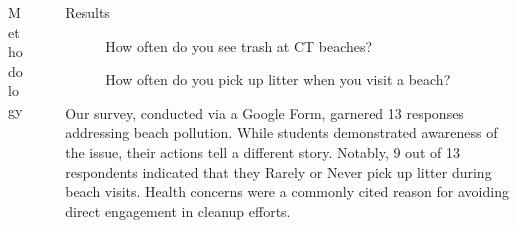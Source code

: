 \documentclass[final]{beamer}
\newlength{\sepwidth}
\newlength{\colwidth}
\newcommand{\separatorcolumn}{\begin{column}{\sepwidth}\end{column}}
\begin{document}
\begin{frame}[t]
\begin{columns}[t]
\begin{column}{\colwidth}
\begin{block}{Methodology}
        \end{block}
      \end{column}

      \separatorcolumn

      \begin{column}{\colwidth}

        \begin{block}{Results}
            \begin{figure}[h!]
                \centering
                \begin{minipage}[t]{0.45\textwidth}
                    \centering
                \caption{\centering How often do you see trash at CT beaches?}
                \end{minipage}%
                \hfill
                \begin{minipage}[t]{0.45\textwidth}
                    \centering
                    \caption{\centering How often do you pick up litter when you visit a beach?}
                \end{minipage}
            \end{figure}
            Our survey, conducted via a Google Form, garnered 13 responses addressing beach pollution. While students demonstrated awareness of the issue, their actions tell a different story. Notably, 9 out of 13 respondents indicated that they Rarely or Never pick up litter during beach visits. Health concerns were a commonly cited reason for avoiding direct engagement in cleanup efforts.

\end{block}
\end{column}
\end{columns}
\end{frame}
\end{document}
